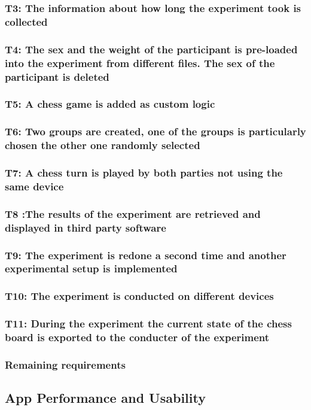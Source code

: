 \subsubsection*{T3: The information about how long the experiment took is collected}

\subsubsection*{T4: The sex and the weight of the participant is pre-loaded into the experiment from different files. The sex of the participant is deleted}

\subsubsection*{T5: A chess game is added as custom logic}

\subsubsection*{T6: Two groups are created, one of the groups is particularly chosen the other one randomly selected}

\subsubsection*{T7: A chess turn is played by both parties not using the same device}

\subsubsection*{T8 :The results of the experiment are retrieved and displayed in third party software}

\subsubsection*{T9: The experiment is redone a second time and another experimental setup is implemented}

\subsubsection*{T10: The experiment is conducted on different devices}

\subsubsection*{T11: During the experiment the current state of the chess board is exported to the conducter of the experiment}

\subsubsection*{Remaining requirements}






\subsection{App Performance and Usability}
